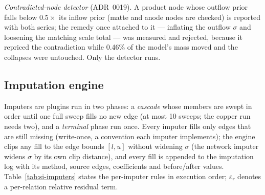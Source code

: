 \documentclass[11pt]{article}
\begin{document}
\emph{Contradicted-node detector} (ADR~0019). A product node whose outflow
prior falls below $0.5\times$ its inflow prior (matte and anode nodes are
checked) is reported with both series; the remedy once attached to it ---
inflating the outflow $\sigma$ and loosening the matching scale total ---
was measured and rejected, because it repriced the contradiction while 0.46\%
of the model's mass moved and the collapses were untouched. Only the
detector runs.

\subsection{Imputation engine}
Imputers are plugins run in two phases: a \emph{cascade} whose members are
swept in order until one full sweep fills no new edge (at most 10 sweeps; the
copper run needs two), and a \emph{terminal} phase run once. Every imputer
fills only edges that are still missing (write-once, a convention each
imputer implements); the engine clips any fill to the edge bounds $[l,u]$
without widening $\sigma$ (the network imputer widens $\sigma$ by its own
clip distance), and every fill is appended to the imputation log with its
method, source edges, coefficients and before/after values.
Table~\ref{tab:si-imputers} states the per-imputer rules in execution order;
$\varepsilon_r$ denotes a per-relation relative residual term.
\end{document}
